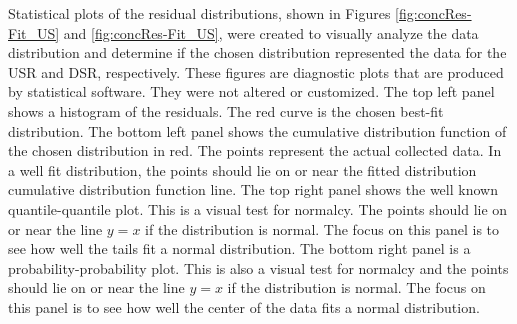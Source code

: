 \begin{linenumbers}
Statistical plots of the residual distributions, shown in Figures \ref{fig:concRes-Fit_US} and \ref{fig:concRes-Fit_US}, were created to visually analyze the data distribution and determine if the chosen distribution represented the data for the USR and DSR, respectively.  These figures are diagnostic plots that are produced by statistical software.  They were not altered or customized.  The top left panel shows a histogram of the residuals.  The red curve is the chosen best-fit distribution.  The bottom left panel shows the cumulative distribution function of the chosen distribution in red.  The points represent the actual collected data.  In a well fit distribution, the points should lie on or near the fitted distribution cumulative distribution function line.  The top right panel shows the well known quantile-quantile plot.  This is a visual test for normalcy.  The points should lie on or near the line $y=x$ if the distribution is normal.  The focus on this panel is to see how well the tails fit a normal distribution.  The bottom right panel is a probability-probability plot.  This is also a visual test for normalcy and the points should lie on or near the line $y=x$ if the distribution is normal.  The focus on this panel is to see how well the center of the data fits a normal distribution.


\end{linenumbers}
